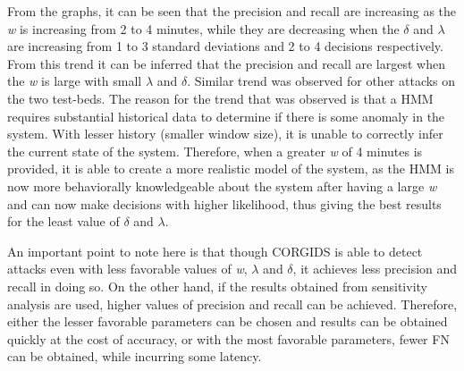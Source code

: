 From the graphs, it can be seen that the precision and recall are increasing as the \textit{w} is increasing from 2 to 4 minutes, while they are decreasing when the $\delta$ and $\lambda$ are increasing from 1 to 3 standard deviations and 2 to 4 decisions respectively. From this trend it can be inferred that the precision and recall are largest when the \textit{w} is large with small $\lambda$ and $\delta$. Similar trend was observed for other attacks on the two test-beds. The reason for the trend that was observed is that a \ac{HMM} requires substantial historical data to determine if there is some anomaly in the system. With lesser history (smaller window size), it is unable to correctly infer the current state of the system. Therefore, when a greater \textit{w} of 4 minutes is provided, it is able to create a more realistic model of the system, as the \ac{HMM} is now more behaviorally knowledgeable about the system after having a large \textit{w} and can now make decisions with higher likelihood, thus giving the best results for the least value of $\delta$ and $\lambda$.


An important point to note here is that though \ac{CORGIDS} is able to detect attacks even with less favorable values of \textit{w}, $\lambda$ and $\delta$, it achieves less precision and recall in doing so. On the other hand, if the results obtained from sensitivity analysis are used, higher values of precision and recall can be achieved. Therefore, either the lesser favorable parameters can be chosen and results can be obtained quickly at the cost of accuracy, or with the most favorable parameters, fewer \ac{FN} can be obtained, while incurring some latency.


